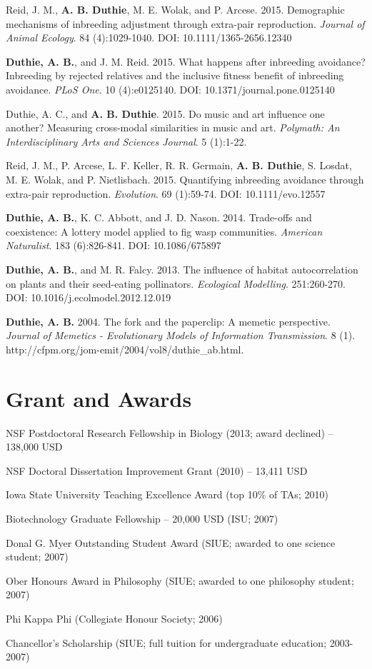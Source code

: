 \documentclass[letterpaper]{article}
\renewenvironment{itemize}{
  \begin{list}{}{
    \setlength{\leftmargin}{1.5em}
  }
}{
  \end{list}
}
\begin{document}
\begin{itemize}
\item Reid, J. M., {\bf A. B. Duthie}, M. E. Wolak, and P. Arcese. 2015. Demographic mechanisms of inbreeding adjustment through extra-pair reproduction. {\it Journal of Animal Ecology}. 84 (4):1029-1040. DOI: 10.1111/1365-2656.12340
\item {\bf Duthie, A. B.}, and J. M. Reid. 2015. What happens after inbreeding avoidance? Inbreeding by rejected relatives and the inclusive fitness benefit of inbreeding avoidance. {\it PLoS One}. 10 (4):e0125140. DOI: 10.1371/journal.pone.0125140
\item Duthie, A. C., and {\bf A. B. Duthie}. 2015. Do music and art influence one another? Measuring cross-modal similarities in music and art. {\it Polymath: An Interdisciplinary Arts and Sciences Journal}. 5 (1):1-22.
\item Reid, J. M., P. Arcese, L. F. Keller, R. R. Germain, {\bf A. B. Duthie}, S. Losdat, M. E. Wolak, and P. Nietlisbach. 2015. Quantifying inbreeding avoidance through extra-pair reproduction. {\it Evolution}. 69 (1):59-74. DOI: 10.1111/evo.12557
\item {\bf Duthie, A. B.}, K. C. Abbott, and J. D. Nason. 2014. Trade-offs and coexistence: A lottery model applied to fig wasp communities. {\it American Naturalist}. 183 (6):826-841. DOI: 10.1086/675897
\item {\bf Duthie, A. B.}, and M. R. Falcy. 2013. The influence of habitat autocorrelation on plants and their seed-eating pollinators. {\it Ecological Modelling}. 251:260-270. DOI: 10.1016/j.ecolmodel.2012.12.019
\item {\bf Duthie, A. B.} 2004. The fork and the paperclip: A memetic perspective. {\it Journal of Memetics - Evolutionary Models of Information Transmission}. 8 (1). http://cfpm.org/jom-emit/2004/vol8/duthie\_ab.html.
\end{itemize}

\section*{Grant and Awards}
\begin{itemize}
\item NSF Postdoctoral Research Fellowship in Biology (2013; award declined) -- 138,000 USD
\item NSF Doctoral Dissertation Improvement Grant (2010) -- 13,411 USD
\item Iowa State University Teaching Excellence Award (top 10\% of TAs; 2010)
\item Biotechnology Graduate Fellowship -- 20,000 USD (ISU; 2007)
\item Donal G. Myer Outstanding Student Award (SIUE; awarded to one science student; 2007)
\item Ober Honours Award in Philosophy (SIUE; awarded to one philosophy student; 2007)
\item Phi Kappa Phi (Collegiate Honour Society; 2006)
\item Chancellor's Scholarship (SIUE; full tuition for undergraduate education; 2003-2007)
\end{itemize}
\end{document}
